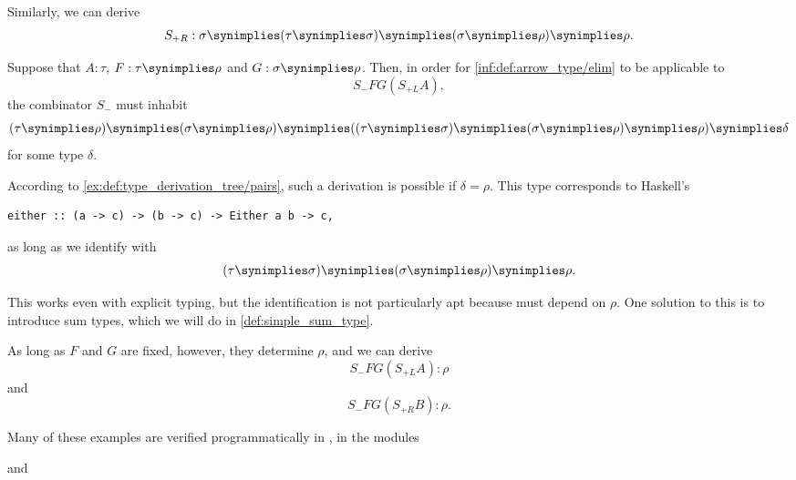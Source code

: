 \begin{example}
\begin{thmenum}
    Similarly, we can derive
    \begin{equation*}
      S_{+R}: \sigma \synimplies (\tau \synimplies \sigma) \synimplies (\sigma \synimplies \rho) \synimplies \rho.
    \end{equation*}

    Suppose that \( A: \tau \), \( F: \tau \synimplies \rho \) and \( G: \sigma \synimplies \rho \). Then, in order for \ref{inf:def:arrow_type/elim} to be applicable to
    \begin{equation*}
      S_- F G (S_{+L} A),
    \end{equation*}
    the combinator \( S_- \) must inhabit
    \begin{equation*}
      (\tau \synimplies \rho) \synimplies (\sigma \synimplies \rho) \synimplies ((\tau \synimplies \sigma) \synimplies (\sigma \synimplies \rho) \synimplies \rho) \synimplies \delta
    \end{equation*}
    for some type \( \delta \).

    According to \cref{ex:def:type_derivation_tree/pairs}, such a derivation is possible if \( \delta = \rho \). This type corresponds to Haskell's
    \begin{Verbatim}[gobble=4]
      either :: (a -> c) -> (b -> c) -> Either a b -> c,
    \end{Verbatim}
    as long as we identify  with
    \begin{equation*}
      (\tau \synimplies \sigma) \synimplies (\sigma \synimplies \rho) \synimplies \rho.
    \end{equation*}

    This works even with explicit typing, but the identification is not particularly apt because  must depend on \( \rho \). One solution to this is to introduce sum types, which we will do in \cref{def:simple_sum_type}.

    As long as \( F \) and \( G \) are fixed, however, they determine \( \rho \), and we can derive
    \begin{equation*}
      S_- F G (S_{+L} A): \rho
    \end{equation*}
    and
    \begin{equation*}
      S_- F G (S_{+R} B): \rho.
    \end{equation*}
  \end{thmenum}
\end{example}
\begin{comments}
  \item Many of these examples are verified programmatically in \cite{notebook:code}, in the modules
  \begin{CodeRefDisplay}
  \end{CodeRefDisplay}
  and
  \begin{CodeRefDisplay}
  \end{CodeRefDisplay}
\end{comments}

